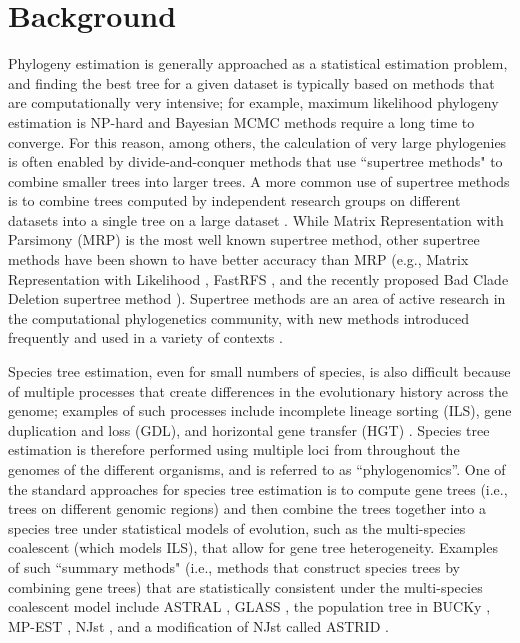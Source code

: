 
\section{Background}
\label{siesta::sec:intro}
Phylogeny estimation is generally approached as a statistical estimation problem, and finding the best tree for a given dataset is typically based on methods that are computationally very intensive; for example, maximum likelihood phylogeny estimation is NP-hard \cite{roch2006short} and Bayesian MCMC methods require a long time to converge. 
For this reason, among others, the calculation of very large phylogenies is often enabled by divide-and-conquer methods that use  ``supertree methods" to combine smaller trees into larger trees.
A more common use of supertree methods is to combine trees computed by independent research groups on different datasets into a single tree on a large dataset \cite{bininda2004phylogenetic}. 
While Matrix Representation with Parsimony (MRP) \cite{baum-mrp,ragan-mrp} is the most well known supertree method, other  supertree methods have been shown to have better accuracy than MRP (e.g., Matrix Representation with Likelihood \cite{nguyen2012mrl}, FastRFS \cite{vachaspati2017fastrfs}, and the recently proposed Bad Clade Deletion  supertree method \cite{fleischauer2017bad}). 
Supertree methods are an area of active research in the computational phylogenetics community, with new methods introduced frequently and used in a variety of contexts \cite{Akanni-Bayesian,holder-redelings-supertree,lafond-supertree-2017}.

Species tree estimation, even for small numbers of species, is also difficult because of multiple processes that create differences in the evolutionary history across the genome; examples of such processes include  incomplete lineage sorting (ILS), gene duplication and loss (GDL), and horizontal gene transfer (HGT) \cite{maddison1997gene}. 
Species tree estimation is therefore performed using multiple loci from throughout the genomes of the different organisms, and is referred to as ``phylogenomics''.
One of the standard approaches for species tree estimation is to compute gene trees (i.e., trees on different genomic regions) and then combine the trees together into a species tree under statistical models of evolution, such as the multi-species coalescent (which models ILS), that allow for gene tree heterogeneity. 
Examples of   such ``summary methods" (i.e.,  methods that construct species trees by combining gene trees) that are statistically consistent under the multi-species coalescent model  include ASTRAL \cite{mirarab2014astral,mirarab2015astral,astral3}, GLASS \cite{mossel2010incomplete},
the population tree in BUCKy \cite{larget2010bucky},
MP-EST \cite{Liu2010a},  
NJst \cite{liu2011estimating}, and a modification of NJst called ASTRID \cite{Vachaspati2015-ASTRID}.

